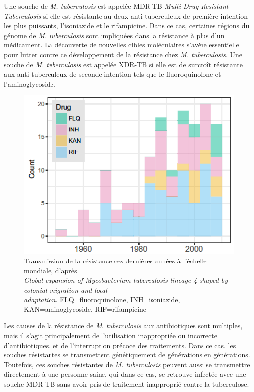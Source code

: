\documentclass[twoside,a4paper,11pt,frenchb,openany]{report}
\begin{document}
Une souche de \textit{M. tuberculosis} est appelée MDR-TB \textit{Multi-Drug-Resistant Tuberculosis} si elle est résistante au deux anti-tuberculeux de première intention les plus puissants, l'isoniazide et le rifampicine. Dans ce cas, certaines régions du génome de \textit{M. tuberculosis} sont impliquées dans la résistance à plus d'un médicament. La découverte de nouvelles cibles moléculaires s'avère essentielle pour lutter contre ce développement de la résistance chez \textit{M. tuberculosis}. Une souche de \textit{M. tuberculosis} est appelée XDR-TB si elle est de surcroît résistante aux anti-tuberculeux de seconde intention tels que le fluoroquinolone et l'aminoglycoside.

\begin{figure}[h!]
\centering
\includegraphics[scale=0.6]{amr.png}
\caption{Transmission de la résistance ces dernières années à l'échelle mondiale, d'après\\ \textit{Global expansion of Mycobacterium tuberculosis lineage 4 shaped by colonial migration and local\\ adaptation}. FLQ=fluoroquinolone, INH=isoniazide, KAN=aminoglycoside, RIF=rifampicine}
\end{figure}

Les causes de la résistance de \textit{M. tuberculosis} aux antibiotiques sont multiples, mais il s'agit principalement de l'utilisation inappropriée ou incorrecte d'antibiotiques, et de l'interruption précoce des traitements. Dans ce cas, les souches résistantes se transmettent génétiquement de générations en générations. Toutefois, ces souches résistantes de \textit{M. tuberculosis} peuvent aussi se transmettre directement à une personne saine, qui dans ce cas, se retrouve infectée avec une souche MDR-TB sans avoir pris de traitement inapproprié contre la tuberculose.
\end{document}
